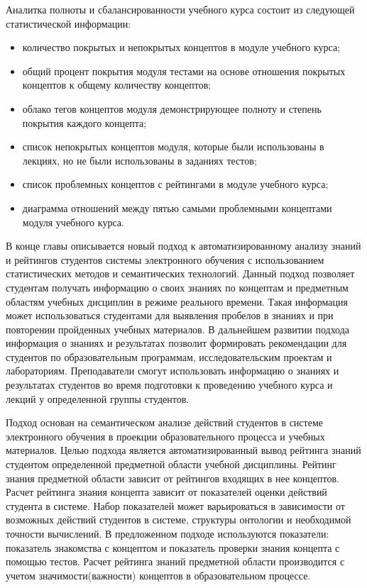 Аналитка полноты и сбалансированности учебного курса состоит из следующей статистической информации:
\begin{itemize}
\item количество покрытых и непокрытых концептов в модуле учебного курса;
\item общий процент покрытия модуля тестами на основе отношения покрытых концептов к общему количеству концептов;
\item облако тегов концептов модуля демонстрирующее полноту и степень покрытия каждого концепта;
\item список непокрытых концептов модуля, которые были использованы в лекциях, но не были использованы в заданиях тестов;
\item список проблемных концептов с рейтингами в модуле учебного курса;
\item диаграмма отношений между пятью самыми проблемными концептами модуля учебного курса.
\end{itemize}


В конце главы описывается новый подход к автоматизированному анализу знаний и рейтингов студентов системы электронного обучения с использованием статистических методов и семантических технологий. Данный подход позволяет студентам получать информацию о своих знаниях по концептам и предметным областям учебных дисциплин в режиме реального времени. Такая информация может использоваться студентами для выявления пробелов в знаниях и при повторении пройденных учебных материалов. В дальнейшем развитии подхода информация о знаниях и результатах позволит формировать рекомендации для студентов по образовательным программам, исследовательским проектам и лабораториям. Преподаватели смогут использовать информацию о знаниях и результатах студентов во время подготовки к проведению учебного курса и лекций у определенной группы студентов.

Подход основан на семантическом анализе действий студентов в системе электронного обучения в проекции образовательного процесса и учебных материалов. Целью подхода является автоматизированный вывод рейтинга знаний студентом определенной предметной области учебной дисциплины. Рейтинг знания предметной области зависит от рейтингов входящих в нее концептов. Расчет рейтинга знания концепта зависит от показателей оценки действий студента в системе. Набор показателей может варьироваться в зависимости от возможных действий студентов в системе, структуры онтологии и необходимой точности вычислений. В предложенном подходе используются показатели: показатель знакомства с концептом и показатель проверки знания концепта с помощью тестов. Расчет рейтинга знаний предметной области производится с учетом значимости(важности) концептов в образовательном процессе.

